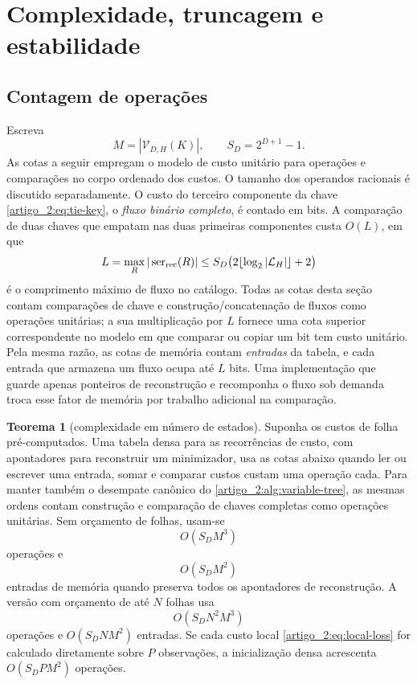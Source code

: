 \documentclass[12pt,a4paper]{article}
\theoremstyle{preciso}
\theoremstyle{definition}
\newcommand{\ser}{\operatorname{ser}}
\newcommand{\Library}{\mathcal{L}}
\newcommand{\Values}{\mathcal{V}}
\theoremstyle{preciso}
\newtheorem{theorem}[teorema]{Teorema}
\theoremstyle{preciso}
\theoremstyle{preciso}
\theoremstyle{preciso}
\theoremstyle{definition}
\theoremstyle{preciso}
\theoremstyle{definition}
\theoremstyle{preciso}
\theoremstyle{preciso}
\theoremstyle{definition}
\begin{document}
\section{Complexidade, truncagem e estabilidade}
\label{artigo_2:sec:complexity-dp}

\subsection{Contagem de operações}

Escreva
\[
 M=|\Values_{D,H}(K)|,\qquad S_D=2^{D+1}-1.
\]
As cotas a seguir empregam o modelo de custo unitário para operações e comparações
no corpo ordenado dos custos. O tamanho dos operandos racionais é discutido
separadamente. O custo do terceiro componente da chave \eqref{artigo_2:eq:tie-key}, o
\emph{fluxo binário completo}, é contado em bits. A comparação de duas
chaves que empatam nas duas primeiras componentes custa
$O(L)$, em que
\begin{equation}
 L=\max_R|\ser_{\rm rec}(R)|
 \le S_D\bigl(2\lfloor\log_2|\Library_H|\rfloor+2\bigr)
 \label{artigo_2:eq:stream-length}
\end{equation}
é o comprimento máximo de fluxo no catálogo. Todas as cotas desta seção contam
comparações de chave e construção/concatenação de fluxos como operações unitárias;
a sua multiplicação por $L$ fornece uma cota superior correspondente no modelo em que
comparar ou copiar um bit tem custo unitário.
Pela mesma razão, as cotas de memória contam \emph{entradas} da tabela, e cada
entrada que armazena um fluxo ocupa até $L$ bits. Uma implementação que
guarde apenas ponteiros de reconstrução e recomponha o fluxo sob demanda
troca esse fator de memória por trabalho adicional na comparação.

\begin{theorem}[complexidade em número de estados]\label{map:artigo_2:9.1}
\label{artigo_2:thm:state-complexity}
Suponha os custos de folha pré-computados. Uma tabela densa para as
recorrências de custo, com apontadores para reconstruir um minimizador,
usa as cotas abaixo quando ler ou escrever uma entrada, somar e comparar
custos custam uma operação cada. Para manter também o desempate canônico do
\cref{artigo_2:alg:variable-tree}, as mesmas ordens contam construção e
comparação de chaves completas como operações unitárias. Sem orçamento de folhas, usam-se
\begin{equation}
 O(S_DM^3)
 \label{artigo_2:eq:dense-time}
\end{equation}
operações e
\begin{equation}
 O(S_DM^2)
 \label{artigo_2:eq:dense-memory}
\end{equation}
entradas de memória quando preserva todos os apontadores de reconstrução.
A versão com orçamento de até $N$ folhas usa
\begin{equation}
 O(S_DN^2M^3)
 \label{artigo_2:eq:budget-time}
\end{equation}
operações e $O(S_DNM^2)$ entradas. Se cada custo local
\eqref{artigo_2:eq:local-loss} for calculado diretamente sobre $P$ observações, a
inicialização densa acrescenta $O(S_DPM^2)$ operações.
\end{theorem}
\end{document}
